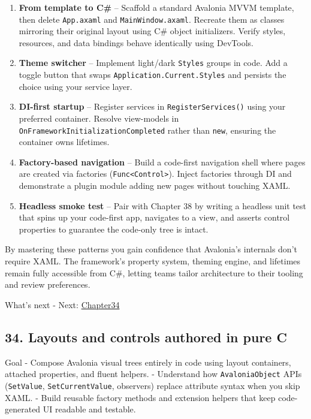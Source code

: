 \begin{enumerate}
\def\labelenumi{\arabic{enumi}.}
\tightlist
\item
  \textbf{From template to C\#} -- Scaffold a standard Avalonia MVVM
  template, then delete \passthrough{\lstinline!App.axaml!} and
  \passthrough{\lstinline!MainWindow.axaml!}. Recreate them as classes
  mirroring their original layout using C\# object initializers. Verify
  styles, resources, and data bindings behave identically using
  DevTools.
\item
  \textbf{Theme switcher} -- Implement light/dark
  \passthrough{\lstinline!Styles!} groups in code. Add a toggle button
  that swaps \passthrough{\lstinline!Application.Current.Styles!} and
  persists the choice using your service layer.
\item
  \textbf{DI-first startup} -- Register services in
  \passthrough{\lstinline!RegisterServices()!} using your preferred
  container. Resolve view-models in
  \passthrough{\lstinline!OnFrameworkInitializationCompleted!} rather
  than \passthrough{\lstinline!new!}, ensuring the container owns
  lifetimes.
\item
  \textbf{Factory-based navigation} -- Build a code-first navigation
  shell where pages are created via factories
  (\passthrough{\lstinline!Func<Control>!}). Inject factories through DI
  and demonstrate a plugin module adding new pages without touching
  XAML.
\item
  \textbf{Headless smoke test} -- Pair with Chapter 38 by writing a
  headless unit test that spins up your code-first app, navigates to a
  view, and asserts control properties to guarantee the code-only tree
  is intact.
\end{enumerate}

By mastering these patterns you gain confidence that Avalonia's
internals don't require XAML. The framework's property system, theming
engine, and lifetimes remain fully accessible from C\#, letting teams
tailor architecture to their tooling and review preferences.

What's next - Next: \href{Chapter34.md}{Chapter34}

\newpage

\subsection{34. Layouts and controls authored in pure
C}\label{layouts-and-controls-authored-in-pure-c}

Goal - Compose Avalonia visual trees entirely in code using layout
containers, attached properties, and fluent helpers. - Understand how
\passthrough{\lstinline!AvaloniaObject!} APIs
(\passthrough{\lstinline!SetValue!},
\passthrough{\lstinline!SetCurrentValue!}, observers) replace attribute
syntax when you skip XAML. - Build reusable factory methods and
extension helpers that keep code-generated UI readable and testable.

